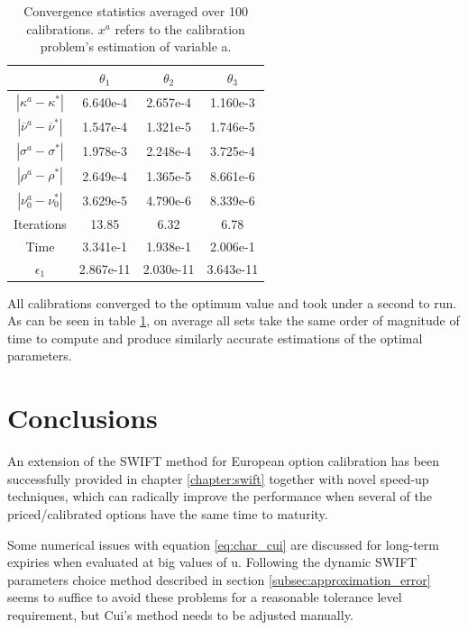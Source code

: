 \documentclass[12,twoside]{mammeTFM}
\theoremstyle{definition}
\theoremstyle{remark}
\begin{document}
\begin{table}[!h]
\begin{center}
 \begin{tabular}{|c | c | c | c|} 
 \hline
  & $\theta_1$ & $\theta_2$ & $\theta_3$\\ [0.5ex] 
 \hline
 $|\kappa^{a} - \kappa^{*}|$ & 6.640e-4 & 2.657e-4 & 1.160e-3 \\ 
 \hline
 $|\overline{\nu}^{a} - \overline{\nu}^{*}|$ & 1.547e-4 & 1.321e-5 & 1.746e-5\\
 \hline
 $|\sigma^{a} - \sigma^{*}|$ & 1.978e-3 & 2.248e-4 & 3.725e-4 \\
 \hline
 $|\rho^{a} - \rho^{*}|$ & 2.649e-4 & 1.365e-5 & 8.661e-6  \\
 \hline
 $|\nu_0^{a} - \nu_0^{*}|$ & 3.629e-5 & 4.790e-6 & 8.339e-6  \\
 \hline
 Iterations & 13.85 & 6.32 & 6.78 \\
 \hline
 Time & 3.341e-1 & 1.938e-1 & 2.006e-1 \\
 \hline
 $\epsilon_1$ & 2.867e-11 & 2.030e-11 & 3.643e-11\\
 \hline
\end{tabular}
\caption{Convergence statistics averaged over 100 calibrations. $x^a$ refers to the calibration problem's estimation of variable a.}\label{table:realistic}
\end{center}
\end{table}

All calibrations converged to the optimum value and took under a second to run. As can be seen in table \ref{table:realistic}, on average all sets take the same order of magnitude of time to compute and produce similarly accurate estimations of the optimal parameters.

\section{Conclusions}

An extension of the SWIFT method for European option calibration has been successfully provided in chapter \ref{chapter:swift} together with novel speed-up techniques, which can radically improve the performance when several of the priced/calibrated options have the same time to maturity.

Some numerical issues with equation \ref{eq:char_cui} are discussed for long-term expiries when evaluated at big values of u. Following the dynamic SWIFT parameters choice method described in section \ref{subsec:approximation_error} seems to suffice to avoid these problems for a reasonable tolerance level requirement, but Cui's method needs to be adjusted manually.
\end{document}
